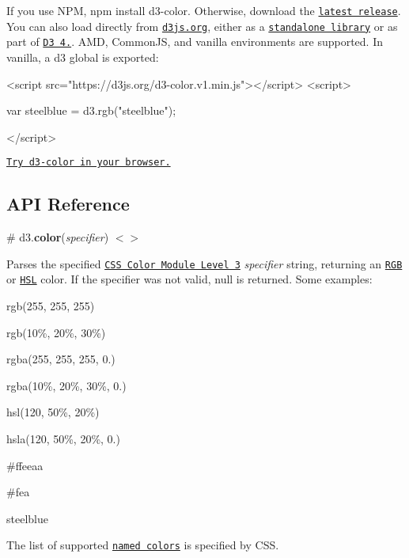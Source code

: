 If you use N\+PM, {\ttfamily npm install d3-\/color}. Otherwise, download the \href{https://github.com/d3/d3-color/releases/latest}{\tt latest release}. You can also load directly from \href{https://d3js.org}{\tt d3js.\+org}, either as a \href{https://d3js.org/d3-color.v1.min.js}{\tt standalone library} or as part of \href{https://github.com/d3/d3}{\tt D3 4.}. A\+MD, Common\+JS, and vanilla environments are supported. In vanilla, a {\ttfamily d3} global is exported\+:


\begin{DoxyCode}
<script src="https://d3js.org/d3-color.v1.min.js"></script>
<script>

var steelblue = d3.rgb("steelblue");

</script>
\end{DoxyCode}


\href{https://tonicdev.com/npm/d3-color}{\tt Try d3-\/color in your browser.}

\subsection*{A\+PI Reference}

\label{_color}%
\# d3.{\bfseries color}({\itshape specifier}) \href{https://github.com/d3/d3-color/blob/master/src/color.js}{\tt $<$$>$}

Parses the specified \href{http://www.w3.org/TR/css3-color/#colorunits}{\tt C\+SS Color Module Level 3} {\itshape specifier} string, returning an \href{#rgb}{\tt R\+GB} or \href{#hsl}{\tt H\+SL} color. If the specifier was not valid, null is returned. Some examples\+:


\begin{DoxyItemize}
\item {\ttfamily rgb(255, 255, 255)}
\item {\ttfamily rgb(10\%, 20\%, 30\%)}
\item {\ttfamily rgba(255, 255, 255, 0.)}
\item {\ttfamily rgba(10\%, 20\%, 30\%, 0.)}
\item {\ttfamily hsl(120, 50\%, 20\%)}
\item {\ttfamily hsla(120, 50\%, 20\%, 0.)}
\item {\ttfamily \#ffeeaa}
\item {\ttfamily \#fea}
\item {\ttfamily steelblue}
\end{DoxyItemize}

The list of supported \href{http://www.w3.org/TR/SVG/types.html#ColorKeywords}{\tt named colors} is specified by C\+SS.

